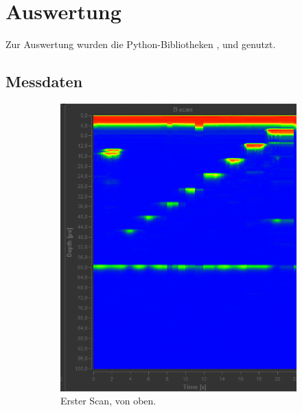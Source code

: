 \section{Auswertung}
\label{sec:Auswertung}

Zur Auswertung wurden die Python-Bibliotheken \cite{numpy}, \cite{matplotlib} und \cite{uncertainties} genutzt.

\subsection{Messdaten}


\begin{figure}
  \centering
  \begin{subfigure}{0.48\textwidth}
    \centering
    \includegraphics[width=\textwidth]{daten/b/1.png}
    \caption{Erster Scan, von oben.}
    \label{fig:db1}
  \end{subfigure}
  \begin{subfigure}{0.48\textwidth}
    \centering

\end{subfigure}
\end{figure}
